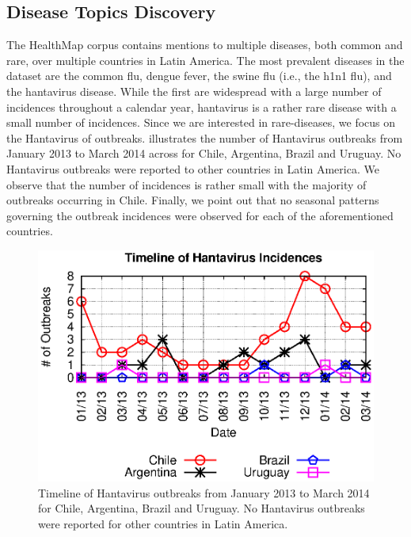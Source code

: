 \documentclass[conference]{IEEEtran}
\begin{document}
\subsection{Disease Topics Discovery}
The HealthMap corpus contains mentions to multiple diseases, both common and rare, over multiple countries in Latin America. The most prevalent diseases in the dataset are the common flu, dengue fever, the swine flu (i.e., the h1n1 flu), and the hantavirus disease. While the first are widespread with a large number of incidences throughout a calendar year, hantavirus is a rather rare disease with a small number of incidences. Since we are interested in rare-diseases, we focus on the  Hantavirus of outbreaks.  illustrates the number of Hantavirus outbreaks from January 2013 to March 2014 across for Chile, Argentina, Brazil and Uruguay. No Hantavirus outbreaks were reported to other countries in Latin America. We observe that the number of incidences is rather small with the majority of outbreaks occurring in Chile. Finally, we point out that no seasonal patterns governing the outbreak incidences were observed for each of the aforementioned countries.

\begin{figure}[t]
\begin{center}
	\includegraphics[trim=0 0 0 0, clip,scale=0.6]{fig/hanta_outbreaks_timeline.eps}
\end{center}
\caption{Timeline of Hantavirus outbreaks from January 2013 to March 2014 for Chile, Argentina, Brazil and Uruguay. No Hantavirus outbreaks were reported for other countries in Latin America.}
 \label{fig:hanta_timeline}
\end{figure}
\end{document}
